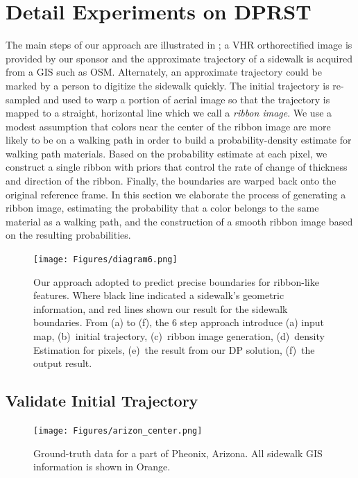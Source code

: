 \chapter{Detail Experiments on \ac{DPRST}}

The main steps of our approach are illustrated in ; a \ac{VHR} orthorectified image is provided by our sponsor and the approximate trajectory of a sidewalk is acquired from a \ac{GIS} such as \ac{OSM}.
Alternately, an approximate trajectory could be marked by a person to digitize the sidewalk quickly. 
The initial trajectory is re-sampled and used to warp a portion of aerial image so that the trajectory is mapped to a straight, horizontal line which we call a \textit{ribbon image}. 
We use a modest assumption that colors near the center of the ribbon image are more likely to be on a walking path in order to build a probability-density estimate for walking path materials. 
Based on the probability estimate at each pixel, we construct a single ribbon with priors that control the rate of change of thickness and direction of the ribbon. 
Finally, the boundaries are warped back onto the original reference frame. 
In this section we elaborate the process of generating a ribbon image, estimating the probability that a color belongs to the same material as a walking path, and the construction of a smooth ribbon image based on the resulting probabilities. 

\begin{figure}[H]
\begin{center}
\texttt{[image: Figures/diagram6.png]}
\caption[Framework Overview]{Our approach adopted to predict precise boundaries for ribbon-like features. Where black line indicated a sidewalk's geometric information, and red lines shown our result for the sidewalk boundaries.
 From (a) to (f), the 6 step approach introduce 
(a) input map, 
(b)~initial trajectory, 
(c)~ribbon image generation, 
(d)~density Estimation for pixels, 
(e)~the result from our \ac{DP} solution, 
(f)~the output result.}
\label{fig:Apparatus}
\end{center}
\end{figure}

\section{Validate Initial Trajectory}

\begin{figure}[H]
\centering 
\texttt{[image: Figures/arizon\_center.png]}
 \caption[Demonstration on Arizona Center]{
Ground-truth data for a part of Pheonix, Arizona. All sidewalk \ac{GIS}
information is shown in Orange.}
\label{fig:arizon_center}
\end{figure}


